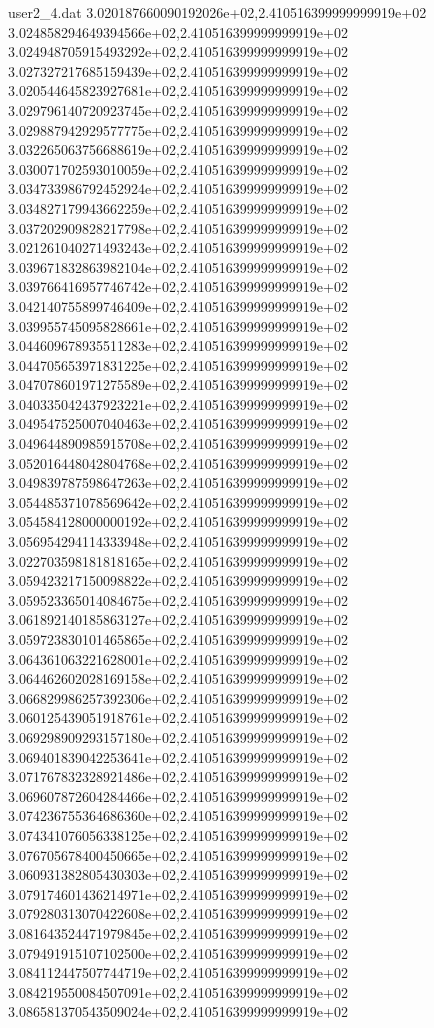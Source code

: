 \begin{filecontents}{user2_4.dat}
3.020187660090192026e+02,2.410516399999999919e+02
3.024858294649394566e+02,2.410516399999999919e+02
3.024948705915493292e+02,2.410516399999999919e+02
3.027327217685159439e+02,2.410516399999999919e+02
3.020544645823927681e+02,2.410516399999999919e+02
3.029796140720923745e+02,2.410516399999999919e+02
3.029887942929577775e+02,2.410516399999999919e+02
3.032265063756688619e+02,2.410516399999999919e+02
3.030071702593010059e+02,2.410516399999999919e+02
3.034733986792452924e+02,2.410516399999999919e+02
3.034827179943662259e+02,2.410516399999999919e+02
3.037202909828217798e+02,2.410516399999999919e+02
3.021261040271493243e+02,2.410516399999999919e+02
3.039671832863982104e+02,2.410516399999999919e+02
3.039766416957746742e+02,2.410516399999999919e+02
3.042140755899746409e+02,2.410516399999999919e+02
3.039955745095828661e+02,2.410516399999999919e+02
3.044609678935511283e+02,2.410516399999999919e+02
3.044705653971831225e+02,2.410516399999999919e+02
3.047078601971275589e+02,2.410516399999999919e+02
3.040335042437923221e+02,2.410516399999999919e+02
3.049547525007040463e+02,2.410516399999999919e+02
3.049644890985915708e+02,2.410516399999999919e+02
3.052016448042804768e+02,2.410516399999999919e+02
3.049839787598647263e+02,2.410516399999999919e+02
3.054485371078569642e+02,2.410516399999999919e+02
3.054584128000000192e+02,2.410516399999999919e+02
3.056954294114333948e+02,2.410516399999999919e+02
3.022703598181818165e+02,2.410516399999999919e+02
3.059423217150098822e+02,2.410516399999999919e+02
3.059523365014084675e+02,2.410516399999999919e+02
3.061892140185863127e+02,2.410516399999999919e+02
3.059723830101465865e+02,2.410516399999999919e+02
3.064361063221628001e+02,2.410516399999999919e+02
3.064462602028169158e+02,2.410516399999999919e+02
3.066829986257392306e+02,2.410516399999999919e+02
3.060125439051918761e+02,2.410516399999999919e+02
3.069298909293157180e+02,2.410516399999999919e+02
3.069401839042253641e+02,2.410516399999999919e+02
3.071767832328921486e+02,2.410516399999999919e+02
3.069607872604284466e+02,2.410516399999999919e+02
3.074236755364686360e+02,2.410516399999999919e+02
3.074341076056338125e+02,2.410516399999999919e+02
3.076705678400450665e+02,2.410516399999999919e+02
3.060931382805430303e+02,2.410516399999999919e+02
3.079174601436214971e+02,2.410516399999999919e+02
3.079280313070422608e+02,2.410516399999999919e+02
3.081643524471979845e+02,2.410516399999999919e+02
3.079491915107102500e+02,2.410516399999999919e+02
3.084112447507744719e+02,2.410516399999999919e+02
3.084219550084507091e+02,2.410516399999999919e+02
3.086581370543509024e+02,2.410516399999999919e+02

\end{filecontents}
